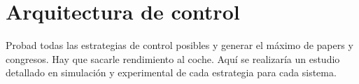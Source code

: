\chapter{Arquitectura de control}
Probad todas las estrategias de control posibles y generar el máximo de papers y congresos. Hay que sacarle rendimiento al coche. Aquí se realizaría un estudio detallado en simulación y experimental de cada estrategia para cada sistema.
\afterpage{\blankpage}